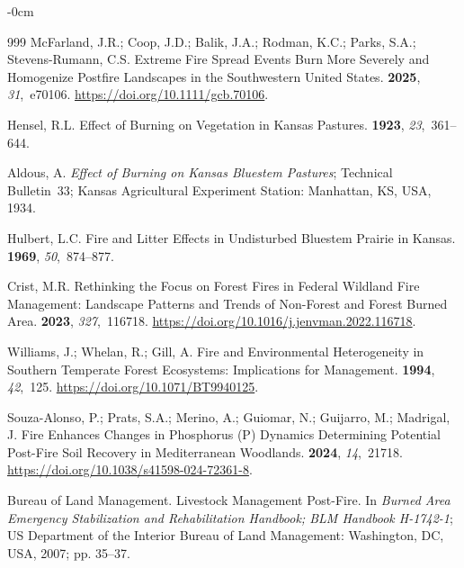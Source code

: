 \documentclass[fire,article,accept,oneauthor,pdftex]{Definitions/mdpi}
\begin{document}
\begin{adjustwidth}{-\extralength}{0cm}
\begin{thebibliography}{999}
McFarland, J.R.; Coop, J.D.; Balik, J.A.; Rodman, K.C.; Parks, S.A.;
  {Stevens-Rumann}, C.S.
\newblock Extreme {{Fire Spread Events Burn More Severely}} and {{Homogenize
  Postfire Landscapes}} in the {{Southwestern United States}}.
 {\bf 2025}, {\em 31},~e70106.
\newblock
  \url{https://doi.org/10.1111/gcb.70106}.

Hensel, R.L.
\newblock Effect of Burning on Vegetation in {{Kansas}} Pastures.
 {\bf 1923}, {\em
  23},~361--644.

Aldous, A.
\newblock \emph{Effect of Burning on {{Kansas}} Bluestem Pastures};
\newblock Technical {{Bulletin}}~33; Kansas Agricultural Experiment Station:
  Manhattan, KS, USA, 1934.

Hulbert, L.C.
\newblock Fire and Litter Effects in Undisturbed Bluestem Prairie in
  {{Kansas}}.
 {\bf 1969}, {\em 50},~874--877.

Crist, M.R.
\newblock Rethinking the Focus on Forest Fires in Federal Wildland Fire
  Management: {{Landscape}} Patterns and Trends of Non-Forest and Forest Burned
  Area.
 {\bf 2023}, {\em
  327},~116718.
\newblock
  \url{https://doi.org/10.1016/j.jenvman.2022.116718}.

Williams, J.; Whelan, R.; Gill, A.
\newblock Fire and {{Environmental Heterogeneity}} in {{Southern Temperate
  Forest Ecosystems}}: {{Implications}} for {{Management}}.
 {\bf 1994}, {\em 42},~125.
\newblock
  \url{https://doi.org/10.1071/BT9940125}.

{Souza-Alonso}, P.; Prats, S.A.; Merino, A.; Guiomar, N.; Guijarro, M.;
  Madrigal, J.
\newblock Fire Enhances Changes in Phosphorus ({{P}}) Dynamics Determining
  Potential Post-Fire Soil Recovery in {{Mediterranean}} Woodlands.
 {\bf 2024}, {\em 14},~21718.
\newblock
  \url{https://doi.org/10.1038/s41598-024-72361-8}.

{Bureau of Land Management}.
\newblock Livestock {{Management Post-Fire}}. In {\em Burned Area Emergency
  Stabilization and Rehabilitation Handbook; {{BLM Handbook H-1742-1}}}; US
  Department of the Interior Bureau of Land Management: Washington, DC, USA, 2007;
  pp. 35--37.


\end{thebibliography}
\end{adjustwidth}
\end{document}
